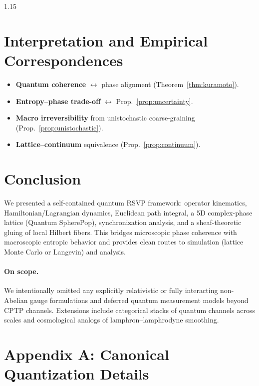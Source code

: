 \documentclass[12pt,a4paper]{article}
\numberwithin{equation}{section}
\theoremstyle{definition}
\theoremstyle{plain}
\theoremstyle{remark}
\begin{document}
\begin{spacing}{1.15}
\section{Interpretation and Empirical Correspondences}\label{sec:interpretation}
\begin{itemize}[leftmargin=1.2em]
\item \textbf{Quantum coherence} $\leftrightarrow$ phase alignment (Theorem~\ref{thm:kuramoto}).
\item \textbf{Entropy--phase trade-off} $\leftrightarrow$ Prop.~\ref{prop:uncertainty}.
\item \textbf{Macro irreversibility} from unistochastic coarse-graining (Prop.~\ref{prop:unistochastic}).
\item \textbf{Lattice--continuum} equivalence (Prop.~\ref{prop:continuum}).
\end{itemize}

\section{Conclusion}\label{sec:conclusion}
We presented a self-contained quantum RSVP framework: operator kinematics, Hamiltonian/Lagrangian dynamics, Euclidean path integral, a 5D complex-phase lattice (Quantum SpherePop), synchronization analysis, and a sheaf-theoretic gluing of local Hilbert fibers. This bridges microscopic phase coherence with macroscopic entropic behavior and provides clean routes to simulation (lattice Monte Carlo or Langevin) and analysis.

\paragraph{On scope.} We intentionally omitted any explicitly relativistic or fully interacting non-Abelian gauge formulations and deferred quantum measurement models beyond CPTP channels. Extensions include categorical stacks of quantum channels across scales and cosmological analogs of lamphron--lamphrodyne smoothing.

\appendix

\section*{Appendix A: Canonical Quantization Details}
\renewcommand\theequation{A.\arabic{equation}}
\setcounter{equation}{0}


\end{spacing}
\end{document}
